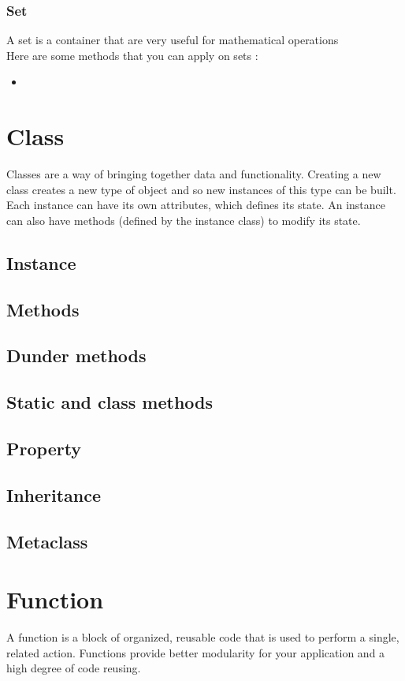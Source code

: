 \documentclass[a4paper, 12pt]{article}
\begin{document}
\subsubsection{Set}
A set is a container that are very useful for mathematical operations\\
Here are some methods that you can apply on sets : 
\begin{itemize}
\item
\end{itemize}

\newpage
\section{Class}
\label{sec:Class}
Classes are a way of bringing together data and functionality. Creating a new class creates a new type of object and so new instances of this type can be built. Each instance can have its own attributes, which defines its state. An instance can also have methods (defined by the instance class) to modify its state.\newline
\subsection{Instance}
\subsection{Methods}
\subsection{Dunder methods}
\subsection{Static and class methods}
\subsection{Property}
\subsection{Inheritance}
\subsection{Metaclass}

\newpage
\section{Function}
\label{sec:Function}
A function is a block of organized, reusable code that is used to perform a single, related action. Functions provide better modularity for your application and a high degree of code reusing.\newline
\end{document}

